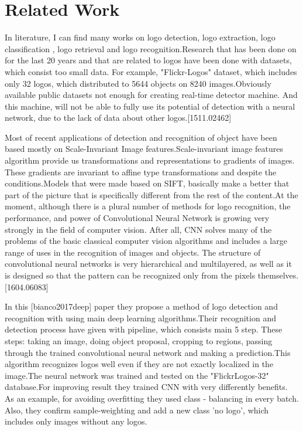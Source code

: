 \section{Related Work}\label{sec:1.2}
\vspace{-0.5cm}
\noindent In literature, I can find many works on logo detection, logo extraction, logo classification , logo retrieval and logo recognition.Research that has been done on for the last 20 years and that are related to logos have been done with datasets, which consist too small data. For example, "Flickr-Logos" dataset, which includes only 32 logos, which distributed to 5644 objects on 8240 images.Obviously available public datasets not enough for creating real-time detector machine. And this machine, will not be able to fully use its potential of detection with a neural network, due to the lack of data about other logos.[1511.02462]

\vspace{-0.3cm}
\par Most of recent applications of detection and recognition of object have been based mostly on Scale-Invariant Image features.Scale-invariant image features algorithm provide us transformations and representations to gradients of images. These gradients are invariant to affine type transformations and despite the conditions.Models that were made based on SIFT, basically make a better that part of the picture that is specifically different from the rest of the content.At the moment, although there is a plural number of methods for logo recognition, the performance, and power of Convolutional Neural Network is growing very strongly in the field of computer vision. After all, CNN solves many of the problems of the basic classical computer vision algorithms and includes a large range of uses in the recognition of images and objects. The structure of convolutional neural networks is very hierarchical and multilayered, as well as it is designed so that the pattern can be recognized only from the pixels themselves.[1604.06083]


\vspace{-0.3cm}
\par In this [bianco2017deep] paper they propose a method of logo detection and recognition with using main deep learning algorithms.Their recognition and detection process have given with pipeline, which consists main 5 step. These steps: taking an image, doing object proposal, cropping to regions, passing through the trained convolutional neural network and making a prediction.This algorithm recognizes logos well even if they are not exactly localized in the image.The neural network was trained and tested on the "FlickrLogos-32" database.For improving result they trained CNN with very differently benefits. As an example, for avoiding overfitting they used class - balancing in every batch. Also, they confirm sample-weighting and add a new class  'no logo', which includes only images without any logos.



